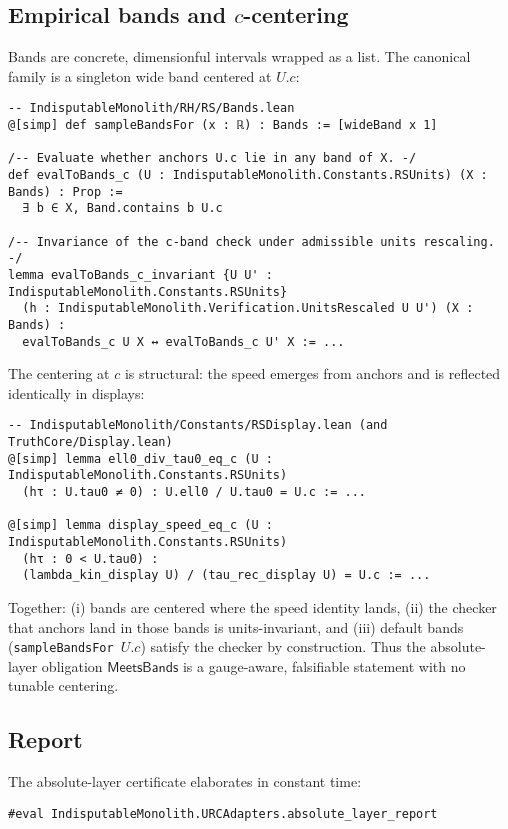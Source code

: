 \documentclass[11pt,a4paper,twoside]{article}
\numberwithin{equation}{section}
\theoremstyle{customthm}
\theoremstyle{customdef}
\theoremstyle{customrem}
\begin{document}
\subsection{Empirical bands and \(c\)-centering}

\noindent Bands are concrete, dimensionful intervals wrapped as a list. The canonical family is a singleton wide band centered at \(U.c\):
\begin{lstlisting}
-- IndisputableMonolith/RH/RS/Bands.lean
@[simp] def sampleBandsFor (x : ℝ) : Bands := [wideBand x 1]

/-- Evaluate whether anchors U.c lie in any band of X. -/
def evalToBands_c (U : IndisputableMonolith.Constants.RSUnits) (X : Bands) : Prop :=
  ∃ b ∈ X, Band.contains b U.c

/-- Invariance of the c-band check under admissible units rescaling. -/
lemma evalToBands_c_invariant {U U' : IndisputableMonolith.Constants.RSUnits}
  (h : IndisputableMonolith.Verification.UnitsRescaled U U') (X : Bands) :
  evalToBands_c U X ↔ evalToBands_c U' X := ...
\end{lstlisting}

\noindent The centering at \(c\) is structural: the speed emerges from anchors and is reflected identically in displays:
\begin{lstlisting}
-- IndisputableMonolith/Constants/RSDisplay.lean (and TruthCore/Display.lean)
@[simp] lemma ell0_div_tau0_eq_c (U : IndisputableMonolith.Constants.RSUnits)
  (hτ : U.tau0 ≠ 0) : U.ell0 / U.tau0 = U.c := ...

@[simp] lemma display_speed_eq_c (U : IndisputableMonolith.Constants.RSUnits)
  (hτ : 0 < U.tau0) :
  (lambda_kin_display U) / (tau_rec_display U) = U.c := ...
\end{lstlisting}

\noindent Together: (i) bands are centered where the speed identity lands, (ii) the checker that anchors land in those bands is units-invariant, and (iii) default bands (\texttt{sampleBandsFor \(U.c\)}) satisfy the checker by construction. Thus the absolute-layer obligation \(\mathsf{MeetsBands}\) is a gauge-aware, falsifiable statement with no tunable centering.

\subsection{Report}

\noindent The absolute-layer certificate elaborates in constant time:
\begin{lstlisting}
#eval IndisputableMonolith.URCAdapters.absolute_layer_report
\end{lstlisting}
\end{document}
